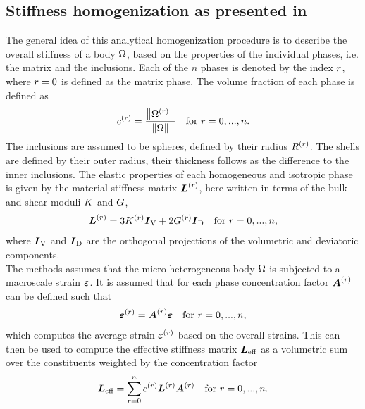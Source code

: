\subsection{Stiffness homogenization as presented in \cite{nee_2012_ammf}}
The general idea of this analytical homogenization procedure is to describe the overall stiffness of a body $\Omega$, based on the properties of the individual phases, i.e. the matrix and the inclusions.
Each of the $n$ phases is denoted by the index $r$, where $r = 0$ is defined as the matrix phase.
The volume fraction of each phase is defined as
\begin{align}
	c^{(r)} = \frac{\left\| \Omega^{(r)} \right\|}{\left\| \Omega \right\|} \quad  \text{for}~ r = 0, ..., n.
\end{align}
The inclusions are assumed to be spheres, defined by their radius $R^{(r)}$.
The shells are defined by their outer radius, their thickness follows as the difference to the inner inclusions.
The elastic properties of each homogeneous and isotropic phase is given by the material stiffness matrix $\boldsymbol{L}^{(r)}$, here written in terms of the bulk and shear moduli $K$ and $G$,
\begin{align}
	\boldsymbol{L}^{(r)}= 3 K^{(r)} \boldsymbol{I}_{\text{V}} + 2 G^{(r)} \boldsymbol{I}_{\text{D}}  \quad \text{for}~ r = 0, ..., n, \label{eq:Lr}
\end{align}
where $\boldsymbol{I}_{\text{V}}$ and $\boldsymbol{I}_{\text{D}}$ are the orthogonal projections of the volumetric and deviatoric components.\\
The methods assumes that the micro-heterogeneous body $\Omega$ is subjected to a macroscale strain $\boldsymbol{\varepsilon}$.
It is assumed that for each phase concentration factor $\boldsymbol{A}^{(r)}$ can be defined such that
\begin{align}
	\boldsymbol{\varepsilon}^{(r)} = \boldsymbol{A}^{(r)}\boldsymbol{\varepsilon} \quad  \text{for}~ r = 0, ..., n, \label{eq:strainaverage}
\end{align}
which computes the average strain $\boldsymbol{\varepsilon}^{(r)}$ based on the overall strains.
This can then be used to compute the effective stiffness matrix $\boldsymbol{L}_{\text{eff}}$ as a volumetric sum over the constituents weighted by the concentration factor 
\begin{align}
	\boldsymbol{L}_{\text{eff}} = \sum_{r=0}^{n} c^{(r)} \boldsymbol{L}^{(r)}\boldsymbol{A}^{(r)} \quad  \text{for}~ r = 0, ..., n.\label{eq:Leff}
\end{align}

